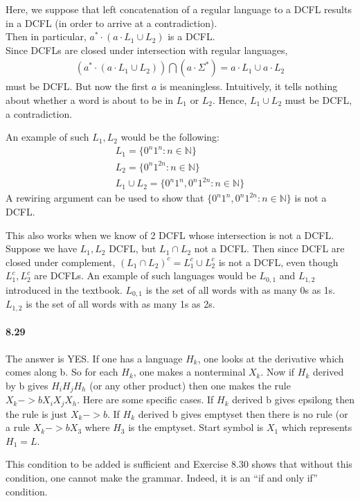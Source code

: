 \documentclass{article}
\begin{document}
Here, we suppose that left concatenation of a regular language to a DCFL results in a DCFL (in order to arrive at a contradiction).\\
Then in particular, $a^*\cdot (a\cdot L_1\cup L_2)$ is a DCFL.\\
Since DCFLs are closed under intersection with regular languages, 
\begin{align*}
	(a^*\cdot (a\cdot L_1\cup L_2)) \bigcap (a\cdot \Sigma^*) = a\cdot L_1 \cup a\cdot L_2
\end{align*} must be DCFL.
But now the first $a$ is meaningless. Intuitively, it tells nothing about whether a word is about to be in $L_1$ or $L_2$. Hence, $L_1\cup L_2$ must be DCFL, a contradiction.

An example of such $L_1, L_2$ would be the following:
\begin{align*}
	L_1 = \{0^n1^n : n\in \mathbb{N}\}\\
	L_2 = \{0^n1^{2n} : n\in \mathbb{N}\}\\
	L_1\cup L_2 = \{0^n1^n, 0^n1^{2n} : n\in \mathbb{N}\}
\end{align*}
A rewiring argument can be used to show that $\{0^n1^n, 0^n1^{2n} : n\in \mathbb{N}\}$ is not a DCFL.

This also works when we know of 2 DCFL whose intersection is not a DCFL. Suppose we have $L_1, L_2$ DCFL, but $L_1\cap L_2$ not a DCFL. Then since DCFL are closed under complement, $(L_1\cap L_2)^c = L_1^c\cup L_2^c$ is not a DCFL, even though $L_1^c,L_2^c$ are DCFLs. An example of such languages would be $L_{0,1}$ and $L_{1,2}$ introduced in the textbook. $L_{0,1}$ is the set of all words with as many 0s as 1s. $L_{1,2}$ is the set of all words with as many 1s as 2s.

\paragraph{8.29}
The answer is YES.
If one has a language $H_k$, one looks at the derivative which comes along b. So for each $H_k$, one makes a nonterminal $X_k$. Now if $H_k$ derived by b gives $H_i H_j H_h$ (or any other product) then one makes the rule $X_k -> b X_i X_j X_h$. Here are some specific cases. If $H_k$ derived b gives {epsilong} then the rule is just $X_k -> b$. If $H_k$ derived b gives emptyset then there is no rule (or a rule $X_k -> b X_3$ where $H_3$ is the emptyset.
Start symbol is $X_1$ which represents $H_1 = L$.

This condition to be added is sufficient and Exercise 8.30 shows that without this condition, one cannot make the grammar. Indeed, it is an “if and only if” condition.
\end{document}
